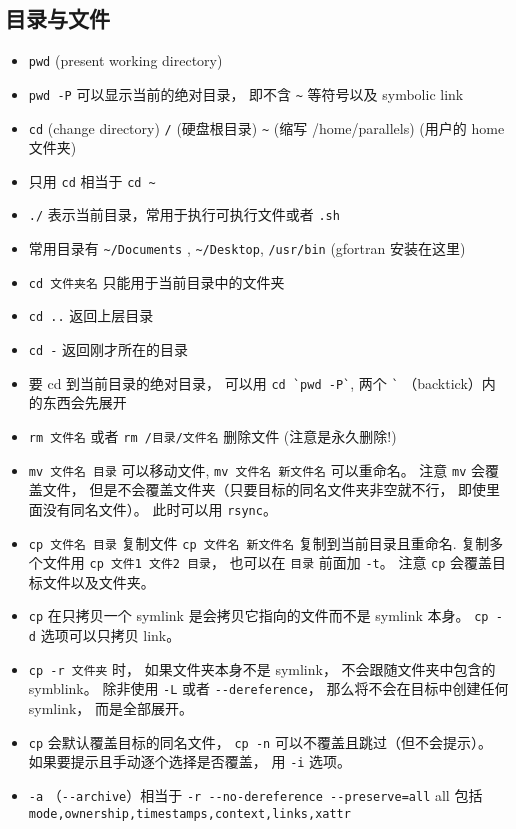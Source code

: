 \subsection{目录与文件}
\begin{itemize}
\item \verb`pwd` (present working directory)
\item \verb`pwd -P` 可以显示当前的绝对目录， 即不含 \verb`~` 等符号以及 symbolic link
\item \verb`cd` (change directory) \verb`/` (硬盘根目录) \verb`~` (缩写 /home/parallels) (用户的 home 文件夹)
\item 只用 \verb`cd` 相当于 \verb`cd ~`
\item \verb`./` 表示当前目录，常用于执行可执行文件或者 \verb`.sh`
\item 常用目录有 \verb`~/Documents` ,  \verb`~/Desktop`, \verb`/usr/bin` (gfortran 安装在这里)
\item \verb`cd 文件夹名` 只能用于当前目录中的文件夹
\item \verb`cd ..` 返回上层目录
\item \verb`cd -` 返回刚才所在的目录
\item 要 cd 到当前目录的绝对目录， 可以用 \verb|cd `pwd -P`|, 两个 \verb|`| （backtick）内的东西会先展开
\item \verb`rm 文件名` 或者 \verb`rm /目录/文件名` 删除文件  (注意是永久删除!)
\item \verb`mv 文件名 目录` 可以移动文件, \verb`mv 文件名 新文件名` 可以重命名。 注意 \verb`mv` 会覆盖文件， 但是不会覆盖文件夹（只要目标的同名文件夹非空就不行， 即使里面没有同名文件）。 此时可以用 \verb`rsync`。
\item \verb`cp 文件名 目录` 复制文件 \verb`cp 文件名 新文件名` 复制到当前目录且重命名. 复制多个文件用 \verb`cp 文件1 文件2 目录`， 也可以在 \verb`目录` 前面加 \verb`-t`。 注意 \verb`cp` 会覆盖目标文件以及文件夹。
\item \verb`cp` 在只拷贝一个 symlink 是会拷贝它指向的文件而不是 symlink 本身。 \verb`cp -d` 选项可以只拷贝 link。
\item \verb`cp -r 文件夹` 时， 如果文件夹本身不是 symlink， 不会跟随文件夹中包含的 symblink。 除非使用 \verb`-L` 或者 \verb`--dereference`， 那么将不会在目标中创建任何 symlink， 而是全部展开。
\item \verb`cp` 会默认覆盖目标的同名文件， \verb`cp -n` 可以不覆盖且跳过（但不会提示）。 如果要提示且手动逐个选择是否覆盖， 用 \verb`-i` 选项。
\item \verb`-a` （\verb`--archive`）相当于 \verb`-r --no-dereference --preserve=all` all 包括 \verb`mode,ownership,timestamps,context,links,xattr`

\end{itemize}
